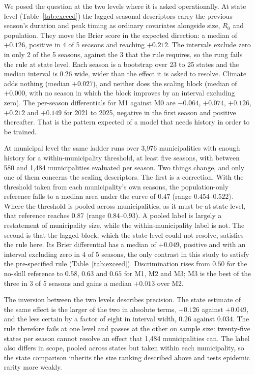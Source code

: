 \documentclass[english,10pt,b5paper]{article}
\begin{document}
We posed the question at the two levels where it is asked operationally. At
state level (Table~\ref{tab:exceed}) the lagged seasonal descriptors carry the
previous season's duration and peak timing as ordinary covariates alongside
size, $R_0$ and population. They move the Brier score in the expected
direction: a median of $+0.126$, positive in 4 of 5 seasons and reaching
$+0.212$. The intervals exclude zero in only 2 of the 5 seasons, against the 3
that the rule requires, so the rung fails the rule at state level. Each season
is a bootstrap over 23 to 25 states and the median interval is $0.26$ wide,
wider than the effect it is asked to resolve. Climate adds nothing (median
$+0.027$), and neither does the scaling block (median of $+0.000$, with no
season in which the block improves by an interval excluding zero). The
per-season differentials for M1 against M0 are $-0.064$, $+0.074$, $+0.126$,
$+0.212$ and $+0.149$ for 2021 to 2025, negative in the first season and
positive thereafter. That is the pattern expected of a model that needs
history in order to be trained.

At municipal level the same ladder runs over 3{,}976 municipalities with
enough history for a within-municipality threshold, at least five seasons,
with between 580 and 1{,}484 municipalities evaluated per season. Two things
change, and only one of them concerns the scaling descriptors. The first is a
correction. With the threshold taken from each municipality's own seasons, the
population-only reference falls to a median area under the curve of $0.47$
(range $0.454$--$0.522$). Where the threshold is pooled across municipalities,
as it must be at state level, that reference reaches $0.87$ (range
$0.84$--$0.93$). A pooled label is largely a restatement of municipality size,
while the within-municipality label is not. The second is that the lagged
block, which the state level could not resolve, satisfies the rule here. Its
Brier differential has a median of $+0.049$, positive and with an interval
excluding zero in 4 of 5 seasons, the only contrast in this study to satisfy
the pre-specified rule (Table~\ref{tab:exceed}). Discrimination rises from
$0.50$ for the no-skill reference to $0.58$, $0.63$ and $0.65$ for M1, M2 and
M3; M3 is the best of the three in 3 of 5 seasons and gains a median $+0.013$
over M2.

The inversion between the two levels describes precision. The state estimate
of the same effect is the larger of the two in absolute terms, $+0.126$
against $+0.049$, and the less certain by a factor of eight in interval width,
$0.26$ against $0.034$. The rule therefore fails at one level and passes at
the other on sample size: twenty-five states per season cannot resolve an
effect that 1{,}484 municipalities can. The label also differs in scope,
pooled across states but taken within each municipality, so the state
comparison inherits the size ranking described above and tests epidemic rarity
more weakly.
\end{document}
